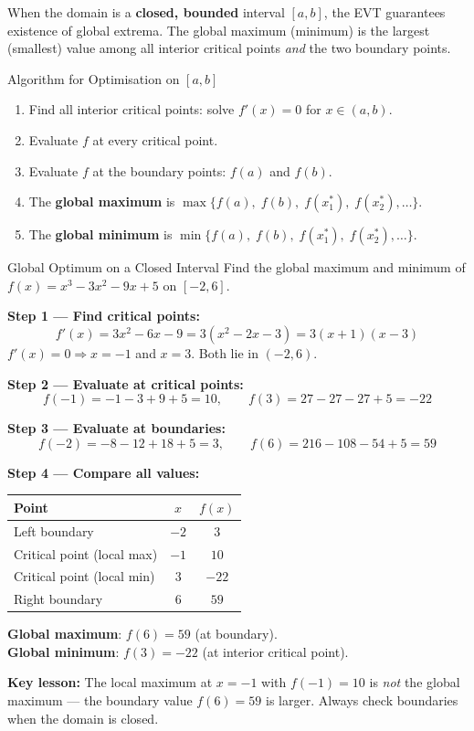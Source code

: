 \documentclass[12pt, a4paper]{article}
\theoremstyle{definition}
\begin{document}
When the domain is a \textbf{closed, bounded} interval $[a,b]$, the EVT
guarantees existence of global extrema.  The global maximum (minimum) is the
largest (smallest) value among all interior critical points \emph{and} the
two boundary points.

\begin{keybox}{Algorithm for Optimisation on $[a,b]$}
\begin{enumerate}
  \item Find all interior critical points: solve $f'(x)=0$ for $x \in (a,b)$.
  \item Evaluate $f$ at every critical point.
  \item Evaluate $f$ at the boundary points: $f(a)$ and $f(b)$.
  \item The \textbf{global maximum} is $\max\{f(a),\;f(b),\;f(x_1^*),\;f(x_2^*),\ldots\}$.
  \item The \textbf{global minimum} is $\min\{f(a),\;f(b),\;f(x_1^*),\;f(x_2^*),\ldots\}$.
\end{enumerate}
\end{keybox}

\begin{exbox}{Global Optimum on a Closed Interval}
Find the global maximum and minimum of $f(x) = x^3 - 3x^2 - 9x + 5$
on $[-2, 6]$.

\textbf{Step 1 --- Find critical points:}
\[
  f'(x) = 3x^2 - 6x - 9 = 3(x^2-2x-3) = 3(x+1)(x-3)
\]
$f'(x) = 0 \Rightarrow x=-1$ and $x=3$. Both lie in $(-2,6)$.

\textbf{Step 2 --- Evaluate at critical points:}
\[
  f(-1) = -1-3+9+5 = 10, \qquad f(3) = 27-27-27+5 = -22
\]

\textbf{Step 3 --- Evaluate at boundaries:}
\[
  f(-2) = -8-12+18+5 = 3, \qquad f(6) = 216-108-54+5 = 59
\]

\textbf{Step 4 --- Compare all values:}

\begin{center}
\begin{tabular}{lcc}
  \toprule
  \rowcolor{tabhead}\color{white}Point & \color{white}$x$ & \color{white}$f(x)$ \\
  \midrule
  Left boundary & $-2$ & $3$ \\
  \rowcolor{tabeven}
  Critical point (local max) & $-1$ & $10$ \\
  Critical point (local min) & $3$ & $-22$ \\
  \rowcolor{tabeven}
  Right boundary & $6$ & $59$ \\
  \bottomrule
\end{tabular}
\end{center}

\textbf{Global maximum}: $f(6)=59$ (at boundary). \\
\textbf{Global minimum}: $f(3)=-22$ (at interior critical point).

\textbf{Key lesson:} The local maximum at $x=-1$ with $f(-1)=10$ is
\emph{not} the global maximum --- the boundary value $f(6)=59$ is larger.
Always check boundaries when the domain is closed.
\end{exbox}
\end{document}
